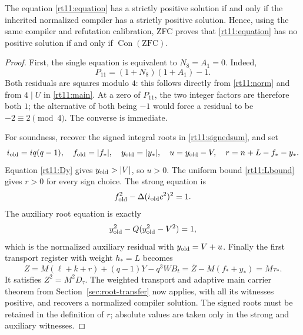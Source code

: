 \begin{theorem}
\label{rt11:theorem}
The equation \eqref{rt11:equation} has a strictly positive solution if
and only if the inherited normalized compiler has a strictly positive
solution. Hence, using the same compiler and refutation calibration,
ZFC proves that \eqref{rt11:equation} has no positive solution if and
only if $\operatorname{Con}(\mathrm{ZFC})$.
\end{theorem}
\begin{proof}
First, the single equation is equivalent to $N_8=A_1=0$. Indeed,
\[
 P_{11}=(1+N_8)(1+A_1)-1.
\]
Both residuals are squares modulo $4$: this follows directly from
\eqref{rt11:norm} and from $4\mid U$ in \eqref{rt11:main}.
At a zero of $P_{11}$, the two integer factors are therefore both $1$;
the alternative of both being $-1$ would force a residual to be
$-2\equiv2\pmod4$. The converse is immediate.

For soundness, recover the signed integral roots in
\eqref{rt11:signedsum}, and set
\[
 i_{\rm old}=iq(q-1),\quad f_{\rm old}=|f_*|,\quad
 y_{\rm old}=|y_*|,\quad u=y_{\rm old}-V,\quad
 r=n+L-f_*-y_*.
\]
Equation \eqref{rt11:Dy} gives $y_{\rm old}>|V|$, so $u>0$.
The uniform bound \eqref{rt11:Lbound} gives $r>0$ for every sign choice.
The strong equation is
\[
 f_{\rm old}^2-\Delta(i_{\rm old}c^2)^2=1.
\]
The auxiliary root equation is exactly
\[
 y_{\rm old}^2-Q(y_{\rm old}^2-V^2)=1,
\]
which is the normalized auxiliary residual with $y_{\rm old}=V+u$.
Finally the first transport register with weight $h_*=L$ becomes
\[
 Z=M(\ell+k+r)+(q-1)Y-q^3WB_t
   =\overline Z-M(f_*+y_*)=M\tau_*.
\]
It satisfies $Z^2=M^2D_\tau$. The weighted transport and adaptive main
carrier theorem from Section~\ref{sec:root-transfer} now applies, with
all its witnesses positive, and recovers a normalized compiler solution.
The signed roots must be retained in the definition of $r$; absolute
values are taken only in the strong and auxiliary witnesses.


\end{proof}
